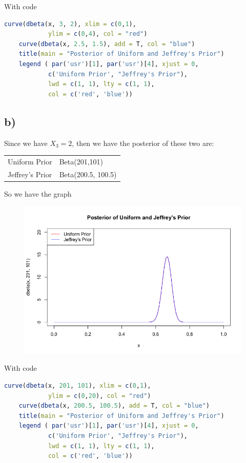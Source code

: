 \documentclass[12pt]{article}
\begin{document}
\begin{flushleft}
\qquad With code

\begin{lstlisting}[language=R]
    curve(dbeta(x, 3, 2), xlim = c(0,1), 
            ylim = c(0,4), col = "red")
    curve(dbeta(x, 2.5, 1.5), add = T, col = "blue")
    title(main = "Posterior of Uniform and Jeffrey's Prior")
    legend ( par('usr')[1], par('usr')[4], xjust = 0, 
            c('Uniform Prior', "Jeffrey's Prior"), 
            lwd = c(1, 1), lty = c(1, 1), 
            col = c('red', 'blue'))
\end{lstlisting} 

\newpage

\subsection*{b)}

\qquad Since we have $X_3 = 2$, then we have the posterior of these two are:

\vspace{-0.2cm}

\begin{table}[h]
\centering
\begin{tabular}{ll}
Uniform Prior & Beta(201,101)\\
Jeffrey's Prior & Beta(200.5, 100.5)
\end{tabular}
\end{table}

\qquad So we have the graph

\begin{figure}[h]
\centering
\includegraphics[width = 0.7\linewidth]{q3_2.png}
\end{figure}

\qquad With code

\begin{lstlisting}[language=R]
    curve(dbeta(x, 201, 101), xlim = c(0,1), 
            ylim = c(0,20), col = "red")
    curve(dbeta(x, 200.5, 100.5), add = T, col = "blue")
    title(main = "Posterior of Uniform and Jeffrey's Prior")
    legend ( par('usr')[1], par('usr')[4], xjust = 0, 
            c('Uniform Prior', "Jeffrey's Prior"), 
            lwd = c(1, 1), lty = c(1, 1), 
            col = c('red', 'blue'))
\end{lstlisting} 


\end{flushleft}
\end{document}
